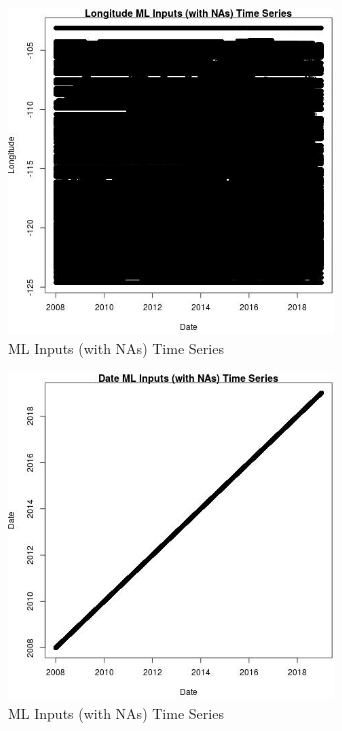 \begin{figure} 
\centering  
\includegraphics[width=0.77\textwidth]{Code_Outputs/Report_ML_input_PM25_Step4_part_f_de_duplicated_aves_prioritize_24hr_obswNAs_LongitudevDate.jpg} 
\caption{\label{fig:Report_ML_input_PM25_Step4_part_f_de_duplicated_aves_prioritize_24hr_obswNAsLongitudevDate}ML Inputs (with NAs) Time Series} 
\end{figure} 
 

\begin{figure} 
\centering  
\includegraphics[width=0.77\textwidth]{Code_Outputs/Report_ML_input_PM25_Step4_part_f_de_duplicated_aves_prioritize_24hr_obswNAs_DatevDate.jpg} 
\caption{\label{fig:Report_ML_input_PM25_Step4_part_f_de_duplicated_aves_prioritize_24hr_obswNAsDatevDate}ML Inputs (with NAs) Time Series} 
\end{figure} 
 

